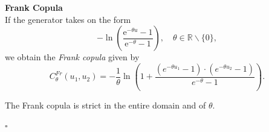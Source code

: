 \textbf{Frank Copula}\\
If the generator takes on the form
\begin{equation}
-\ln \left(\frac{\mathrm{e}^{-\theta u}-1}{\mathrm{e}^{-\theta}-1}\right), \quad \theta \in \mathbb{R} \backslash\{0\},
\end{equation}
we obtain the \textit{Frank copula} given by
\begin{equation}
C_{\theta}^{F r}\left(u_{1}, u_{2}\right)=-\frac{1}{\theta} \ln \left(1+\frac{\left(e^{-\theta u_{1}}-1\right) \cdot\left(e^{-\theta u_{2}}-1\right)}{e^{-\theta}-1}\right).
\end{equation}

The Frank copula is strict in the entire domain and of $\theta$.


\hfill $\square$ \\



